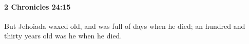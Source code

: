 
		\paragraph{2 Chronicles 24:15} %
			\label{2CHRONICLES-24-15}

			But Jehoiada waxed old, and was full of days when he died; an hundred and thirty years old was he when he died.


